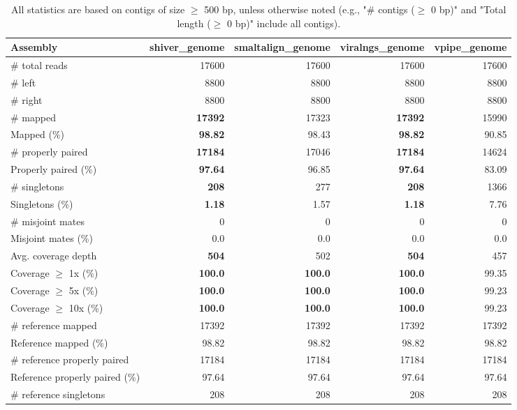 \documentclass[12pt,a4paper]{article}
\begin{document}
\begin{table}[ht]
\begin{center}
\caption{All statistics are based on contigs of size $\geq$ 500 bp, unless otherwise noted (e.g., "\# contigs ($\geq$ 0 bp)" and "Total length ($\geq$ 0 bp)" include all contigs).}
\begin{tabular}{|l*{4}{|r}|}
\hline
Assembly & shiver\_genome & smaltalign\_genome & viralngs\_genome & vpipe\_genome \\ \hline
\# total reads & 17600 & 17600 & 17600 & 17600 \\ \hline
\# left & 8800 & 8800 & 8800 & 8800 \\ \hline
\# right & 8800 & 8800 & 8800 & 8800 \\ \hline
\# mapped & {\bf 17392} & 17323 & {\bf 17392} & 15990 \\ \hline
Mapped (\%) & {\bf 98.82} & 98.43 & {\bf 98.82} & 90.85 \\ \hline
\# properly paired & {\bf 17184} & 17046 & {\bf 17184} & 14624 \\ \hline
Properly paired (\%) & {\bf 97.64} & 96.85 & {\bf 97.64} & 83.09 \\ \hline
\# singletons & {\bf 208} & 277 & {\bf 208} & 1366 \\ \hline
Singletons (\%) & {\bf 1.18} & 1.57 & {\bf 1.18} & 7.76 \\ \hline
\# misjoint mates & 0 & 0 & 0 & 0 \\ \hline
Misjoint mates (\%) & 0.0 & 0.0 & 0.0 & 0.0 \\ \hline
Avg. coverage depth & {\bf 504} & 502 & {\bf 504} & 457 \\ \hline
Coverage $\geq$ 1x (\%) & {\bf 100.0} & {\bf 100.0} & {\bf 100.0} & 99.35 \\ \hline
Coverage $\geq$ 5x (\%) & {\bf 100.0} & {\bf 100.0} & {\bf 100.0} & 99.23 \\ \hline
Coverage $\geq$ 10x (\%) & {\bf 100.0} & {\bf 100.0} & {\bf 100.0} & 99.23 \\ \hline
\# reference mapped & 17392 & 17392 & 17392 & 17392 \\ \hline
Reference mapped (\%) & 98.82 & 98.82 & 98.82 & 98.82 \\ \hline
\# reference properly paired & 17184 & 17184 & 17184 & 17184 \\ \hline
Reference properly paired (\%) & 97.64 & 97.64 & 97.64 & 97.64 \\ \hline
\# reference singletons & 208 & 208 & 208 & 208 \\ \hline

\end{tabular}
\end{center}
\end{table}
\end{document}
